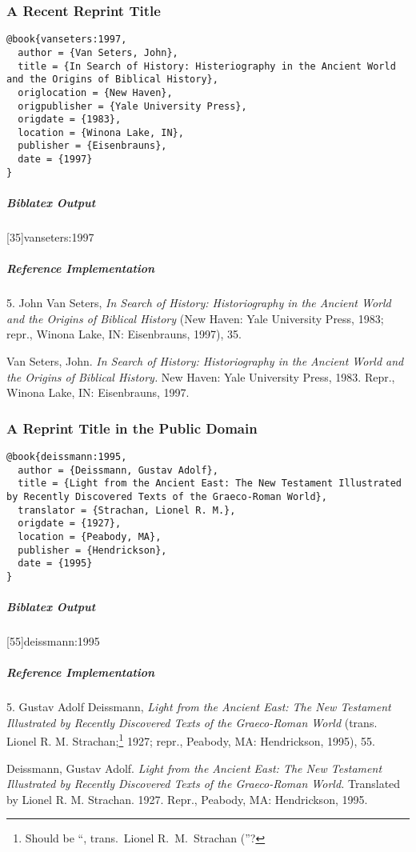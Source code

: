 \documentclass[a4paper]{article}
\newenvironment{biboutput}{%
  \subparagraph{Biblatex Output}
}{\color{black}}
\newenvironment{refimp}{%
  \subparagraph{Reference Implementation}
  \color{reference-colour}
  \rm
}{\par\color{black}}
\begin{document}
\subsubsection{A Recent Reprint Title}

\begin{lstlisting}
@book{vanseters:1997,
  author = {Van Seters, John},
  title = {In Search of History: Histeriography in the Ancient World and the Origins of Biblical History},
  origlocation = {New Haven},
  origpublisher = {Yale University Press},
  origdate = {1983},
  location = {Winona Lake, IN},
  publisher = {Eisenbrauns},
  date = {1997}
}
\end{lstlisting}  

\begin{biboutput}
  [35]{vanseters:1997}
\end{biboutput}

\begin{refimp}
  5. John Van Seters, \emph{In Search of History: Historiography in the
  Ancient World and the Origins of Biblical History} (New Haven: Yale
  University Press, 1983; repr., Winona Lake, IN: Eisenbrauns, 1997), 35.

  \hangindent\bibindent Van Seters, John. \emph{In Search of History:
  Historiography in the Ancient World and the Origins of Biblical History.}
  New Haven: Yale University Press, 1983. Repr., Winona Lake, IN: Eisenbrauns,
  1997.
\end{refimp}

\subsubsection{A Reprint Title in the Public Domain}

\begin{lstlisting}
@book{deissmann:1995,
  author = {Deissmann, Gustav Adolf},
  title = {Light from the Ancient East: The New Testament Illustrated by Recently Discovered Texts of the Graeco-Roman World},
  translator = {Strachan, Lionel R. M.},
  origdate = {1927},
  location = {Peabody, MA},
  publisher = {Hendrickson},
  date = {1995}
}
\end{lstlisting}  

\begin{biboutput}
  [55]{deissmann:1995}
\end{biboutput}

\begin{refimp}
  5. Gustav Adolf Deissmann, \emph{Light from the Ancient East: The New Testament
  Illustrated by Recently Discovered Texts of the Graeco-Roman World} (trans.
  Lionel R. M. Strachan;\footnote{Should be “, trans.\ Lionel R.\ M.\ Strachan
  (”?} 1927; repr., Peabody, MA: Hendrickson, 1995), 55.

  \hangindent\bibindent Deissmann, Gustav Adolf. \emph{Light from the Ancient
  East: The New Testament Illustrated by Recently Discovered Texts of the
  Graeco-Roman World.} Translated by Lionel R. M. Strachan. 1927. Repr., Peabody,
  MA: Hendrickson, 1995.
\end{refimp}
\end{document}
